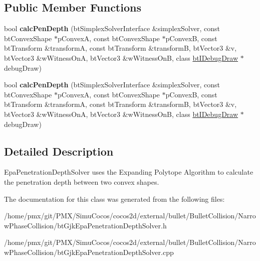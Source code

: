 \subsection*{Public Member Functions}
\begin{DoxyCompactItemize}
\item 
\mbox{\label{classbtGjkEpaPenetrationDepthSolver_aaeeab27cb89355993c849a1a7ff9e34a}} 
bool {\bfseries calc\+Pen\+Depth} (bt\+Simplex\+Solver\+Interface \&simplex\+Solver, const bt\+Convex\+Shape $\ast$p\+ConvexA, const bt\+Convex\+Shape $\ast$p\+ConvexB, const bt\+Transform \&transformA, const bt\+Transform \&transformB, bt\+Vector3 \&v, bt\+Vector3 \&w\+Witness\+OnA, bt\+Vector3 \&w\+Witness\+OnB, class \hyperlink{classbtIDebugDraw}{bt\+I\+Debug\+Draw} $\ast$debug\+Draw)
\item 
\mbox{\label{classbtGjkEpaPenetrationDepthSolver_aaeeab27cb89355993c849a1a7ff9e34a}} 
bool {\bfseries calc\+Pen\+Depth} (bt\+Simplex\+Solver\+Interface \&simplex\+Solver, const bt\+Convex\+Shape $\ast$p\+ConvexA, const bt\+Convex\+Shape $\ast$p\+ConvexB, const bt\+Transform \&transformA, const bt\+Transform \&transformB, bt\+Vector3 \&v, bt\+Vector3 \&w\+Witness\+OnA, bt\+Vector3 \&w\+Witness\+OnB, class \hyperlink{classbtIDebugDraw}{bt\+I\+Debug\+Draw} $\ast$debug\+Draw)
\end{DoxyCompactItemize}


\subsection{Detailed Description}
Epa\+Penetration\+Depth\+Solver uses the Expanding Polytope Algorithm to calculate the penetration depth between two convex shapes. 

The documentation for this class was generated from the following files\+:\begin{DoxyCompactItemize}
\item 
/home/pmx/git/\+P\+M\+X/\+Simu\+Cocos/cocos2d/external/bullet/\+Bullet\+Collision/\+Narrow\+Phase\+Collision/bt\+Gjk\+Epa\+Penetration\+Depth\+Solver.\+h\item 
/home/pmx/git/\+P\+M\+X/\+Simu\+Cocos/cocos2d/external/bullet/\+Bullet\+Collision/\+Narrow\+Phase\+Collision/bt\+Gjk\+Epa\+Penetration\+Depth\+Solver.\+cpp\end{DoxyCompactItemize}
